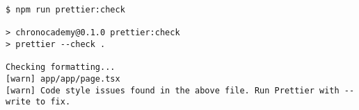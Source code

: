 \begin{verbatim}
$ npm run prettier:check

> chronocademy@0.1.0 prettier:check
> prettier --check .

Checking formatting...
[warn] app/app/page.tsx
[warn] Code style issues found in the above file. Run Prettier with --write to fix.
\end{verbatim}
